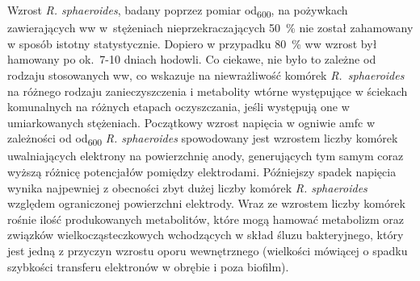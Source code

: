 Wzrost \textit{R. sphaeroides}, badany poprzez pomiar
\acrshort{od}\textsubscript{600}, na pożywkach zawierających
\acrshort{ww} w~stężeniach nieprzekraczających 50~\%
nie został zahamowany w sposób istotny statystycznie.
Dopiero w przypadku 80~\% \acrshort{ww} wzrost był hamowany
po ok.\ 7-10 dniach hodowli.
Co ciekawe, nie było to zależne od rodzaju stosowanych
\acrshort{ww}, co wskazuje na niewrażliwość komórek
\textit{R.~sphaeroides} na różnego rodzaju zanieczyszczenia
i metabolity wtórne występujące w ściekach komunalnych
na różnych etapach oczyszczania, jeśli występują one
w umiarkowanych stężeniach.
Początkowy wzrost napięcia w ogniwie \acrshort{amfc}
w zależności od \acrshort{od}\textsubscript{600}
\textit{R. sphaeroides} spowodowany jest wzrostem liczby
komórek uwalniających elektrony na powierzchnię anody,
generujących tym samym coraz wyższą różnicę potencjałów
pomiędzy elektrodami.
Późniejszy spadek napięcia wynika najpewniej z obecności
zbyt dużej liczby komórek \textit{R. sphaeroides}
względem ograniczonej powierzchni elektrody.
Wraz ze wzrostem liczby komórek rośnie ilość produkowanych
metabolitów, które mogą hamować metabolizm oraz związków
wielkocząsteczkowych wchodzących w skład śluzu bakteryjnego,
który jest jedną z przyczyn wzrostu oporu wewnętrznego
(wielkości mówiącej o spadku szybkości transferu elektronów
w obrębie i poza biofilm).
